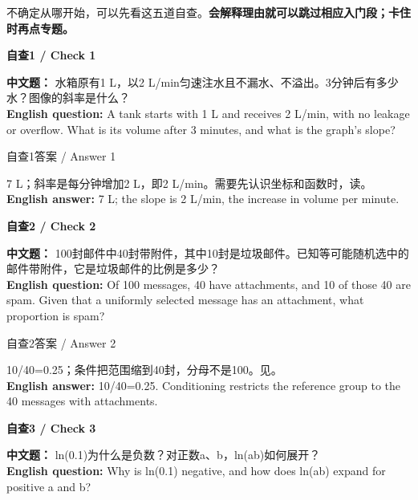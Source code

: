 不确定从哪开始，可以先看这五道自查。\textbf{会解释理由就可以跳过相应入门段；卡住时再点专题。}


\textbf{自查1 / Check 1}


\textbf{中文题：} 水箱原有1 L，以2 L/min匀速注水且不漏水、不溢出。3分钟后有多少水？图像的斜率是什么？\\

\textbf{English question:} A tank starts with 1 L and receives 2 L/min, with no leakage or overflow. What is its volume after 3 minutes, and what is the graph's slope?



\begin{StudySolution}{自查1答案 / Answer 1}


7 L；斜率是每分钟增加2 L，即2 L/min。需要先认识坐标和函数时，读。\\

\textbf{English answer:} 7 L; the slope is 2 L/min, the increase in volume per minute.


\end{StudySolution}


\textbf{自查2 / Check 2}


\textbf{中文题：} 100封邮件中40封带附件，其中10封是垃圾邮件。已知等可能随机选中的邮件带附件，它是垃圾邮件的比例是多少？\\

\textbf{English question:} Of 100 messages, 40 have attachments, and 10 of those 40 are spam. Given that a uniformly selected message has an attachment, what proportion is spam?



\begin{StudySolution}{自查2答案 / Answer 2}


10/40=0.25；条件把范围缩到40封，分母不是100。见。\\

\textbf{English answer:} 10/40=0.25. Conditioning restricts the reference group to the 40 messages with attachments.


\end{StudySolution}


\textbf{自查3 / Check 3}


\textbf{中文题：} ln(0.1)为什么是负数？对正数a、b，ln(ab)如何展开？\\

\textbf{English question:} Why is ln(0.1) negative, and how does ln(ab) expand for positive a and b?



